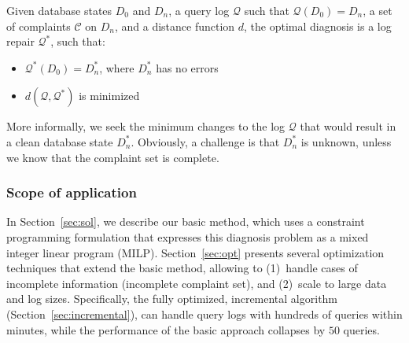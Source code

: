 \begin{definition}\label{def:problem}
    Given database states $D_0$ and $D_n$, a query log $\mathcal{Q}$ such that $\mathcal{Q}(D_0)=D_n$, a set of complaints $\mathcal{C}$ on $D_n$,  and a distance function $d$, the optimal diagnosis is a log repair $\mathcal{Q}^*$, such that:
    \begin{itemize}[itemsep=0pt, parsep=0pt]
        \item $\mathcal{Q}^*(D_0)=D_n^*$, where $D_n^*$ has no errors
        \item $d(\mathcal{Q}, \mathcal{Q}^*)$ is minimized
    \end{itemize}
\end{definition}

More informally, we seek the minimum changes to the log $\mathcal{Q}$
that would result in a clean database state $D_n^*$. Obviously, a
challenge is that $D_n^*$ is unknown, unless we know that the
complaint set is complete. 

\subsubsection*{Scope of application}


In Section~\ref{sec:sol}, we describe our basic method, 
which
uses a constraint programming formulation that expresses this
diagnosis problem as a mixed integer linear program (MILP). 
Section~\ref{sec:opt} presents several optimization
techniques that extend the basic method, allowing \sys to 
(1)~handle cases of incomplete information (incomplete complaint set), and
(2)~scale to large data and log sizes. 
Specifically, the fully optimized, incremental algorithm (Section~\ref{sec:incremental}), can
handle query logs with hundreds of queries within minutes, while the performance of the basic approach collapses by $50$ queries.

